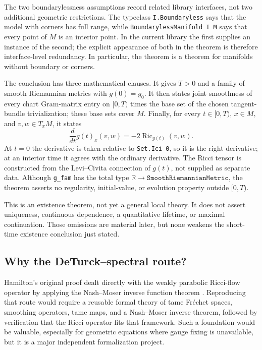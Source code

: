 \documentclass[11pt]{article}
\theoremstyle{plain}
\theoremstyle{definition}
\theoremstyle{remark}
\newcommand{\Ric}{\operatorname{Ric}}
\begin{document}
The two boundarylessness assumptions record related library interfaces, not
two additional geometric restrictions.  The typeclass \texttt{I.Boundaryless}
says that the model with corners has full range, while
\texttt{BoundarylessManifold I M} says that every point of $M$ is an interior
point.  In the current library the first supplies an instance of the second;
the explicit appearance of both in the theorem is therefore interface-level
redundancy.  In particular, the theorem is a theorem for manifolds without
boundary or corners.

The conclusion has three mathematical clauses.  It gives $T>0$ and a family
of smooth Riemannian metrics with $g(0)=g_0$.  It then states joint smoothness
of every chart Gram-matrix entry on $[0,T)$ times the base set of the chosen
tangent-bundle trivialization; these base sets cover $M$.  Finally, for every
$t\in[0,T)$, $x\in M$, and $v,w\in T_xM$, it states
\[
  \frac{d}{dt}g(t)_x(v,w)=-2\Ric_{g(t)}(v,w).
\]
At $t=0$ the derivative is taken relative to \texttt{Set.Ici 0}, so it is the
right derivative; at an interior time it agrees with the ordinary derivative.
The Ricci tensor is constructed from the Levi--Civita connection of $g(t)$,
not supplied as separate data.  Although \texttt{g\_fam} has the total type
$\mathbb R\to\mathtt{SmoothRiemannianMetric}$, the theorem asserts no
regularity, initial-value, or evolution property outside $[0,T)$.

This is an existence theorem, not yet a general local theory.  It does not
assert uniqueness, continuous dependence, a quantitative lifetime, or maximal
continuation.  Those omissions are material later, but none weakens the
short-time existence conclusion just stated.

\subsection{Why the DeTurck--spectral route?}
\label{subsec:short-time-route-choice}

Hamilton's original proof dealt directly with the weakly parabolic Ricci-flow
operator by applying the Nash--Moser inverse function theorem
\cite{MR664497}.  Reproducing that route would require a reusable
formal theory of tame Fr\'echet spaces, smoothing operators, tame maps, and a
Nash--Moser inverse theorem, followed by verification that the Ricci operator
fits that framework.  Such a foundation would be valuable, especially for
geometric equations where gauge fixing is unavailable, but it is a major
independent formalization project.
\end{document}
